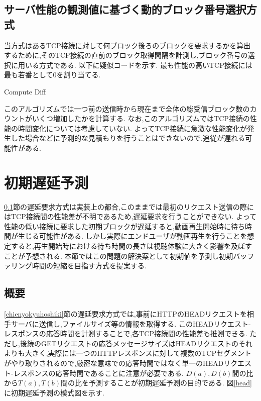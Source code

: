 \documentclass[a4j,12pt]{gradthesis_utf8}
\begin{document}
\subsection{サーバ性能の観測値に基づく動的ブロック番号選択方式}
\label{diff}
当方式はあるTCP接続に対して何ブロック後ろのブロックを要求するかを算出するために,そのTCP接続の直前のブロック取得間隔を計測し,ブロック番号の選択に用いる方式である.
以下に疑似コードを示す.
最も性能の高いTCP接続には最も若番として0を割り当てる.

\begin{algorithm}
	\caption{Compute Diff}
	\begin{algorithmic}[1]
		\Else 
		\EndIf
	\end{algorithmic}
\end{algorithm}

このアルゴリズムでは一つ前の送信時から現在まで全体の総受信ブロック数のカウントがいくつ増加したかを計算する.
なお,このアルゴリズムではTCP接続の性能の時間変化については考慮していない.
よってTCP接続に急激な性能変化が発生した場合などに予測的な見積もりを行うことはできないので,追従が遅れる可能性がある.

\newpage

\section{初期遅延予測}
\label{shoki}
\ref{diff}節の遅延要求方式は実装上の都合,このままでは最初のリクエスト送信の際にはTCP接続間の性能差が不明であるため,遅延要求を行うことができない.
よって性能の低い接続に要求した初期ブロックが遅延すると,動画再生開始時に待ち時間が生じる可能性がある.
しかし実際にエンドユーザが動画再生を行うことを想定すると,再生開始時における待ち時間の長さは視聴体験に大きく影響を及ぼすことが予想される.
本節ではこの問題の解決案として初期値を予測し初期バッファリング時間の短縮を目指す方式を提案する.

\subsection{概要}
\label{shokigaiyo}
\ref{chienyokyuhoshiki}節の遅延要求方式では,事前にHTTPのHEADリクエストを相手サーバに送信し,ファイルサイズ等の情報を取得する.
このHEADリクエスト-レスポンスの応答時間を計測することで,各TCP接続間の性能差も推測できる.
ただし,後続のGETリクエストの応答メッセージサイズはHEADリクエストのそれよりも大きく,実際には一つのHTTPレスポンスに対して複数のTCPセグメントがやり取りされるので,厳密な意味での応答時間ではなく単一のHEADリクエスト-レスポンスの応答時間であることに注意が必要である.
\begin{math}D(a), D(b)\end{math}間の比から\begin{math}T(a), T(b)\end{math}間の比を予測することが初期遅延予測の目的である.
図\ref{head}に初期遅延予測の模式図を示す.
\end{document}
